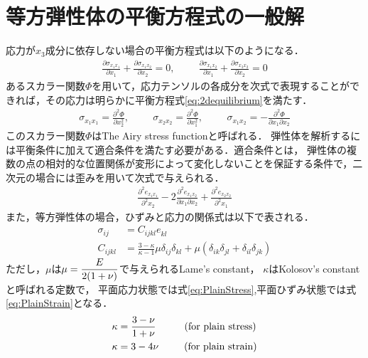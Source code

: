 \newpage

\section{等方弾性体の平衡方程式の一般解}
応力が$x_{3}$成分に依存しない場合の平衡方程式は以下のようになる．
\begin{align}
	\frac{\partial \sigma_{x_{1}x_{1}}}{\partial x_{1}}+\frac{\partial \sigma_{x_{1}x_{2}}}{\partial x_{2}}=0,\hspace{1cm}
	\frac{\partial \sigma_{x_{1}x_{2}}}{\partial x_{1}}+\frac{\partial \sigma_{x_{2}x_{2}}}{\partial x_{2}}=0
	\label{eq:2dequilibrium}
\end{align}
あるスカラー関数$\Phi$を用いて，応力テンソルの各成分を次式で表現することができれば，その応力は明らかに平衡方程式\eqref{eq:2dequilibrium}を満たす．
\begin{align}
	\sigma_{x_{1}x_{1}}=\frac{\partial^2 \Phi}{\partial x_{2}^2},\hspace{1cm}
	\sigma_{x_{2}x_{2}}=\frac{\partial^2 \Phi}{\partial x_{1}^2},\hspace{1cm}
	\sigma_{x_{1}x_{2}}=-\frac{\partial^2 \Phi}{\partial x_{1} \partial x_{2}}
	\label{eq:Airyxy}
\end{align}
このスカラー関数$\Phi$はThe Airy stress functionと呼ばれる．
弾性体を解析するには平衡条件に加えて適合条件を満たす必要がある．適合条件とは，
弾性体の複数の点の相対的な位置関係が変形によって変化しないことを保証する条件で，二次元の場合には歪みを用いて次式で与えられる．
\begin{align}
	\frac{\partial^2 e_{x_{1}x_{1}}}{\partial^2 x_{2}}
	-2\frac{\partial^2 e_{x_{1}x_{2}}}{\partial x_{1} \partial x_{2}}
	+\frac{\partial^2 e_{x_{2}x_{2}}}{\partial^2 x_{1}}
	\label{eq:Compatibility}
\end{align}
また，等方弾性体の場合，ひずみと応力の関係式は以下で表される．
\begin{align}
	\sigma_{ij}&=C_{ijkl}^{}e_{kl}^{}
	\nonumber
	\\
	C_{ijkl}&=\frac{3-\kappa}{\kappa-1}\mu\delta_{ij}\delta_{kl}
	+\mu(\delta_{ik}\delta_{jl}+\delta_{il}\delta_{jk})
	\label{eq:Constitute}
\end{align}
ただし，$\mu$は$\mu=\displaystyle\frac{E}{2(1+\nu)}$で与えられるLame's constant，
$\kappa$はKolosov's constantと呼ばれる定数で，
平面応力状態では式\eqref{eq:PlainStress},平面ひずみ状態では式\eqref{eq:PlainStrain}となる．
\begin{align}
	\kappa&=\frac{3-\nu}{1+\nu}\hspace{1cm}\text{(for plain stress)}
	\label{eq:PlainStress}
	\\
	\kappa&=3-4\nu\hspace{0.9cm}\text{(for plain strain)}
	\label{eq:PlainStrain}
\end{align}
